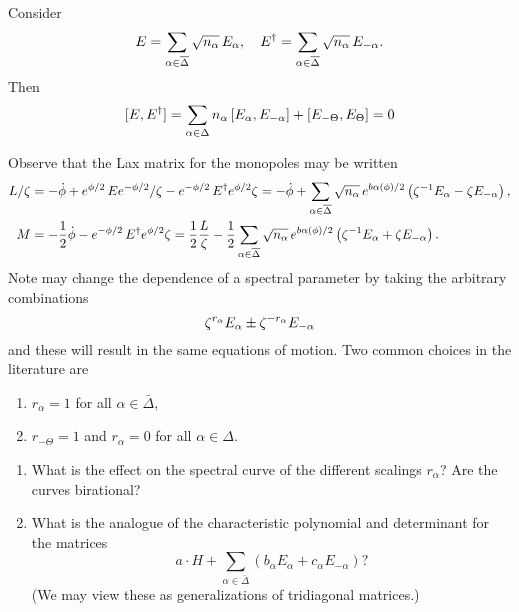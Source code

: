 \documentclass{article}
\begin{document}
Consider 
$$E=\sum_{\alpha\in \bar\Delta} \sqrt{n_\alpha}\, E_\alpha,\quad
E\sp\dagger=\sum_{\alpha\in \bar\Delta} \sqrt{n_\alpha}\, E_{-\alpha}.
$$
Then
$$[E,E\sp\dagger]=\sum_{\alpha\in\Delta}  {n_\alpha}\,[E_\alpha, E_{-\alpha}]+[ E_{-\Theta},E_\Theta]
=0$$

Observe that the Lax matrix for the monopoles may be written 
\begin{align*}
L/\zeta&= -\dot\phi +e^{\phi/2}\,Ee^{-\phi/2}/\zeta-e^{-\phi/2}\,E\sp\dagger e^{\phi/2}\zeta
= -\dot\phi +
\sum_{\alpha\in\bar\Delta}\sqrt{n_\alpha}\, e^{b\alpha(\phi)/2} \left(
\zeta\sp{-1} E_\alpha - \zeta E_{-\alpha}
\right),\\
M&=-\frac12 \dot\phi -e^{-\phi/2}\,E\sp\dagger e^{\phi/2}\zeta
=\frac12 \frac{L}{\zeta} -\frac12 \sum_{\alpha\in\bar\Delta}\sqrt{n_\alpha}\, e^{b\alpha(\phi)/2} \left(
\zeta\sp{-1} E_\alpha + \zeta E_{-\alpha}
\right).
\end{align*}
Note may change the dependence of a spectral parameter by taking the arbitrary combinations
$$ \zeta\sp{r_\alpha} E_\alpha \pm \zeta\sp{-r_\alpha} E_{-\alpha}$$
and these will result in the same equations of motion. Two common choices in the literature are
\begin{enumerate}
	\item $r_\alpha=1$ for all $\alpha\in\bar\Delta$,
	\item $r_{-\Theta}=1$ and $r_\alpha=0$ for all $\alpha\in\Delta$.
\end{enumerate}



\begin{enumerate}
	\item What is the effect on the spectral curve of the different scalings $r_\alpha$? Are the curves birational?
	\item What is the analogue of the characteristic polynomial and determinant for the matrices
	$$a\cdot H+\sum_{\alpha\in\bar\Delta} \left(b_\alpha E_\alpha+c_{\alpha}E_{-\alpha}\right)?$$
	(We may view these as generalizations of tridiagonal matrices.)
\end{enumerate}



\end{document}
